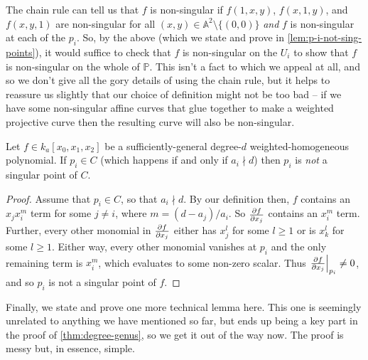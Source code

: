 \documentclass[10pt,notitlepage]{article}
\numberwithin{equation}{subsection}
\newcommand{\aff}{\mathbb{A}}
\newcommand{\pee}{\mathbb{P}}
\newcommand{\kathree}{k_a[x_0,x_1,x_2]}
\begin{document}
            The chain rule can tell us that $f$ is non-singular if $f(1,x,y)$, $f(x,1,y)$, and $f(x,y,1)$ are non-singular for all $(x,y)\in\aff^2\setminus\{(0,0)\}$ \emph{and} $f$ is non-singular at each of the $p_i$.
            So, by the above (which we state and prove in \cref{lem:p-i-not-sing-points}), it would suffice to check that $f$ is non-singular on the $U_i$ to show that $f$ is non-singular on the whole of $\pee$.
            This isn't a fact to which we appeal at all, and so we don't give all the gory details of using the chain rule, but it helps to reassure us slightly that our choice of definition might not be too bad -- if we have some non-singular affine curves that glue together to make a weighted projective curve then the resulting curve will also be non-singular.

            \begin{lemma}\label{lem:p-i-not-sing-points}
                Let $f\in\kathree$ be a sufficiently-general degree-$d$ weighted-homogeneous polynomial.
                If $p_i\in C$ (which happens if and only if $a_i\nmid d$) then $p_i$ is \emph{not} a singular point of $C$.
            \end{lemma}

            \begin{proof}
                Assume that $p_i\in C$, so that $a_i\nmid d$.
                By our definition then, $f$ contains an $x_jx_i^m$ term for some $j\neq i$, where $m=(d-a_j)/a_i$.
                So $\pdv{f}{x_j}$ contains an $x_i^m$ term.
                Further, every other monomial in $\pdv{f}{x_j}$ either has $x_j^l$ for some $l\geqslant1$ or is $x_k^l$ for some $l\geqslant1$.
                Either way, every other monomial vanishes at $p_i$ and the only remaining term is $x_i^m$, which evaluates to some non-zero scalar.
                Thus $\eval{\pdv{f}{x_j}}_{p_i}\neq0$, and so $p_i$ is not a singular point of $f$.
            \end{proof}

            Finally, we state and prove one more technical lemma here.
            This one is seemingly unrelated to anything we have mentioned so far, but ends up being a key part in the proof of \cref{thm:degree-genus}, so we get it out of the way now.
            The proof is messy but, in essence, simple.
\end{document}
